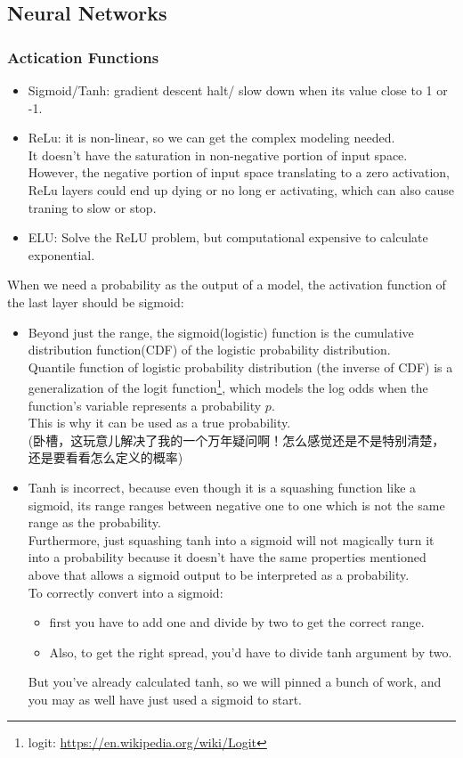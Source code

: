 \subsection{Neural Networks}
\subsubsection{Actication Functions}
\begin{itemize}
	\item Sigmoid/Tanh: gradient descent halt/ slow down when its value close to 1 or -1.
	\item ReLu: it is non-linear, so we can get the complex modeling needed.\\
	It doesn't have the saturation in non-negative portion of input space.\\
	However, the negative portion of input space translating to a zero activation, ReLu layers could end up dying or no long er activating, which can also cause traning to slow or stop.
	\item ELU: Solve the ReLU problem, but computational expensive to calculate exponential.
	
\end{itemize}
When we need a probability as the output of a model, the activation function of the last layer should be sigmoid: 
\begin{itemize}
	\item  Beyond just the range, the sigmoid(logistic) function is the cumulative distribution function(CDF) of the logistic probability distribution.\\
	Quantile function of logistic probability distribution (the inverse of CDF) is a generalization of the logit function\footnote{logit: \url{https://en.wikipedia.org/wiki/Logit}}, which models the log odds when the function's variable represents a probability $ p $.\\
	This is why it can be used as a true probability.\\
	(卧槽，这玩意儿解决了我的一个万年疑问啊！怎么感觉还是不是特别清楚，还是要看看怎么定义的概率)
	\item  Tanh is incorrect, because even though it is a squashing function like a sigmoid, its range ranges between negative one to one which is not the same range as the probability. \\
	Furthermore, just squashing tanh into a sigmoid will not magically turn it into a probability because it doesn't have the same properties mentioned above that allows a sigmoid output to be interpreted as a probability.\\
	To correctly convert into a sigmoid:
	\begin{itemize}
		\item first you have to add one and divide by two to get the correct range.
		\item Also, to get the right spread, you'd have to divide tanh argument by two. 
	\end{itemize} 
	But you've already calculated tanh, so we will pinned a bunch of work, and you may as well have just used a sigmoid to start.
\end{itemize}


